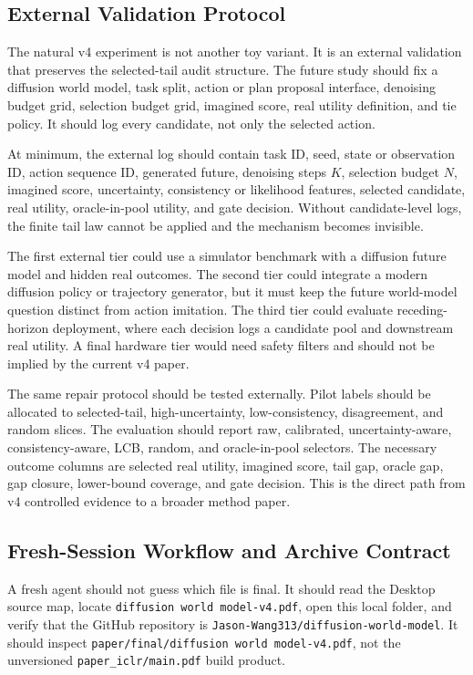 \documentclass{article}
\begin{document}
\subsection{External Validation Protocol}
\label{app:v4-external-protocol}

The natural v4 experiment is not another toy variant. It is an external
validation that preserves the selected-tail audit structure. The future study
should fix a diffusion world model, task split, action or plan proposal
interface, denoising budget grid, selection budget grid, imagined score, real
utility definition, and tie policy. It should log every candidate, not only
the selected action.

At minimum, the external log should contain task ID, seed, state or observation
ID, action sequence ID, generated future, denoising steps $K$, selection
budget $N$, imagined score, uncertainty, consistency or likelihood features,
selected candidate, real utility, oracle-in-pool utility, and gate decision.
Without candidate-level logs, the finite tail law cannot be applied and the
mechanism becomes invisible.

The first external tier could use a simulator benchmark with a diffusion
future model and hidden real outcomes. The second tier could integrate a
modern diffusion policy or trajectory generator, but it must keep the future
world-model question distinct from action imitation. The third tier could
evaluate receding-horizon deployment, where each decision logs a candidate
pool and downstream real utility. A final hardware tier would need safety
filters and should not be implied by the current v4 paper.

The same repair protocol should be tested externally. Pilot labels should be
allocated to selected-tail, high-uncertainty, low-consistency, disagreement,
and random slices. The evaluation should report raw, calibrated,
uncertainty-aware, consistency-aware, LCB, random, and oracle-in-pool
selectors. The necessary outcome columns are selected real utility, imagined
score, tail gap, oracle gap, gap closure, lower-bound coverage, and gate
decision. This is the direct path from v4 controlled evidence to a broader
method paper.

\subsection{Fresh-Session Workflow and Archive Contract}
\label{app:v4-fresh-session}

A fresh agent should not guess which file is final. It should read the Desktop
source map, locate \texttt{diffusion world model-v4.pdf}, open this local
folder, and verify that the GitHub repository is
\texttt{Jason-Wang313/diffusion-world-model}. It should inspect
\texttt{paper/final/diffusion world model-v4.pdf}, not the unversioned
\texttt{paper\_iclr/main.pdf} build product.
\end{document}
